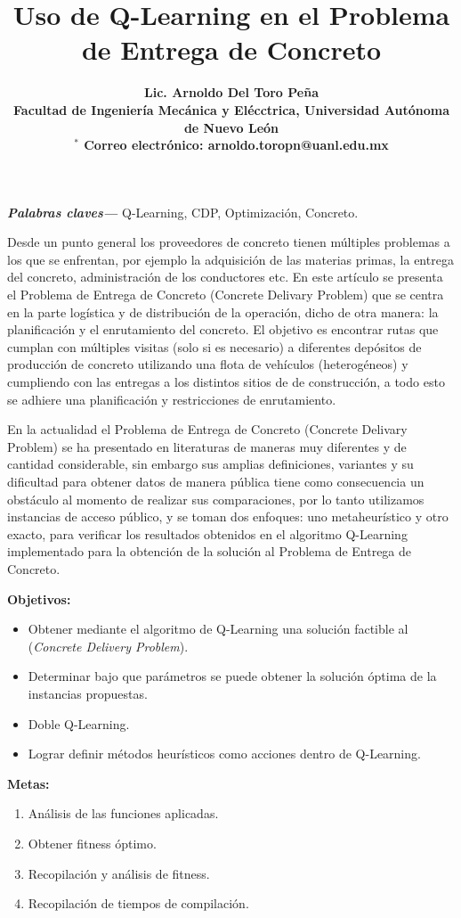 \documentclass[10pt]{article}
\title{\bf Uso de Q-Learning en el Problema de Entrega de Concreto}
\author{\bf Lic. Arnoldo Del Toro Peña \\
\normalsize{
Facultad de Ingeniería Mecánica y Elécctrica, Universidad Autónoma de Nuevo León}\\
\normalsize{
$^\ast$ Correo electr\'onico:  arnoldo.toropn@uanl.edu.mx}
}
\date{\empty}
\providecommand{\keywords}[1]
{
  \small	
  \textbf{\textit{Palabras claves---}} #1
}
\begin{document}
\maketitle
\keywords{Q-Learning, CDP, Optimización, Concreto.}\\
\medskip

%
%
Desde un punto general los proveedores de concreto tienen múltiples problemas a los que se enfrentan, por ejemplo la adquisición de las materias primas, la entrega del concreto, administración de los conductores etc. En este artículo se presenta el Problema de Entrega de Concreto (Concrete Delivary Problem) que se centra en la parte logística y de distribución de la operación, dicho de otra manera: la planificación y el enrutamiento del concreto. El objetivo es encontrar rutas que cumplan con múltiples visitas (solo si es necesario) a diferentes depósitos de producción de concreto utilizando una flota de vehículos (heterogéneos) y cumpliendo con las entregas a los distintos sitios de de construcción, a todo esto se adhiere una planificación y restricciones de enrutamiento.

En la actualidad el Problema de Entrega de Concreto (Concrete Delivary Problem) se ha presentado en literaturas de maneras muy diferentes y de cantidad considerable, sin embargo sus amplias definiciones, variantes y su dificultad para obtener datos de manera pública tiene como consecuencia un obstáculo al momento de realizar sus comparaciones, por lo tanto utilizamos instancias de acceso público, y se toman dos enfoques: uno metaheurístico y otro exacto, para verificar los resultados obtenidos en el algoritmo Q-Learning implementado para la obtención de la solución al Problema de Entrega de Concreto.

\textbf{Objetivos:} 
	\begin{itemize}
		\item Obtener mediante el algoritmo de Q-Learning una solución factible al (\textit{Concrete Delivery Problem}).
		\item Determinar bajo que parámetros se puede obtener la solución óptima de la instancias propuestas.
		\item Doble Q-Learning.
		\item Lograr definir métodos heurísticos como acciones dentro de Q-Learning.
	\end{itemize}

\textbf{Metas:} 
  \begin{enumerate}
    \item Análisis de las funciones aplicadas.
    \item Obtener fitness óptimo.
    \item Recopilación y análisis de fitness.
    \item Recopilación de tiempos de compilación.
  \end{enumerate}
\end{document}
